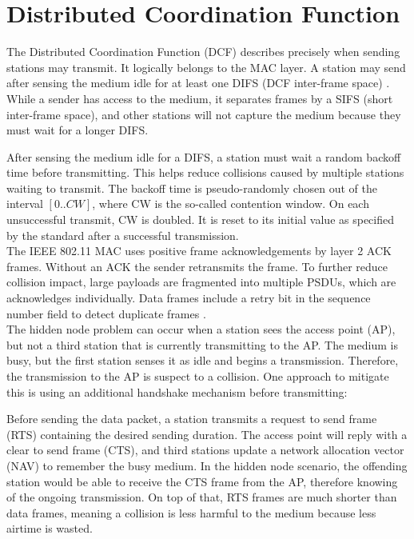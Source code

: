 
\section{Distributed Coordination Function}

The Distributed Coordination Function (DCF) describes precisely when sending stations may transmit. It logically belongs to the MAC layer. A station may send after sensing the medium idle for at least one DIFS (DCF inter-frame space) \cite{bianchi2000}. While a sender has access to the medium, it separates frames by a SIFS (short inter-frame space), and other stations will not capture the medium because they must wait for a longer DIFS.

After sensing the medium idle for a DIFS, a station must wait a random backoff time before transmitting. This helps reduce collisions caused by multiple stations waiting to transmit. The backoff time is pseudo-randomly chosen out of the interval $[0..CW]$, where CW is the so-called contention window. On each unsuccessful transmit, CW is doubled. It is reset to its initial value as specified by the standard after a successful transmission.\\

The IEEE 802.11 MAC uses positive frame acknowledgements by layer 2 ACK frames. Without an ACK the sender retransmits the frame. To further reduce collision impact, large payloads are fragmented into multiple PSDUs, which are acknowledges individually. Data frames include a retry bit in the sequence number field to detect duplicate frames \cite{NEEDED}.\\

The hidden node problem can occur when a station sees the access point (AP), but not a third station that is currently transmitting to the AP. The medium is busy, but the first station senses it as idle and begins a transmission. Therefore, the transmission to the AP is suspect to a collision. One approach to mitigate this is using an additional handshake mechanism before transmitting:

Before sending the data packet, a station transmits a request to send frame (RTS) containing the desired sending duration. The access point will reply with a clear to send frame (CTS), and third stations update a network allocation vector (NAV) to remember the busy medium. In the hidden node scenario, the offending station would be able to receive the CTS frame from the AP, therefore knowing of the ongoing transmission. On top of that, RTS frames are much shorter than data frames, meaning a collision is less harmful to the medium because less airtime is wasted.


